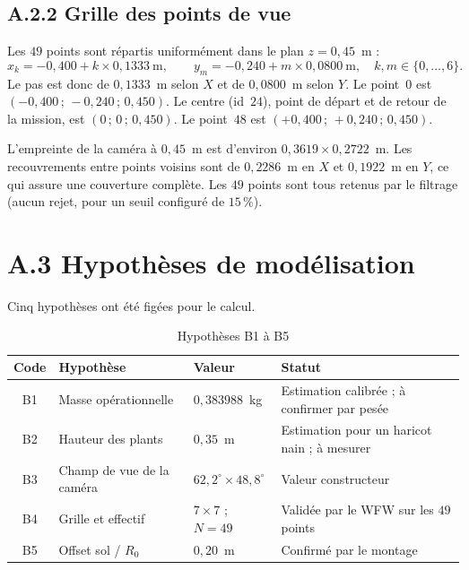 \subsection*{A.2.2 Grille des points de vue}

Les $49$ points sont répartis uniformément dans le plan $z = 0{,}45$~m :
\begin{equation*}
x_k = -0{,}400 + k \times 0{,}1333~\text{m},
\qquad
y_m = -0{,}240 + m \times 0{,}0800~\text{m},
\quad k, m \in \{0, \ldots, 6\}.
\end{equation*}
Le pas est donc de $0{,}1333$~m selon $X$ et de $0{,}0800$~m selon $Y$. Le point~$0$ est $(-0{,}400\,;\, -0{,}240\,;\, 0{,}450)$. Le centre (id~$24$), point de départ et de retour de la mission, est $(0\,;\, 0\,;\, 0{,}450)$. Le point~$48$ est $(+0{,}400\,;\, +0{,}240\,;\, 0{,}450)$.

L'empreinte de la caméra à $0{,}45$~m est d'environ $0{,}3619 \times 0{,}2722$~m. Les recouvrements entre points voisins sont de $0{,}2286$~m en $X$ et $0{,}1922$~m en $Y$, ce qui assure une couverture complète. Les $49$ points sont tous retenus par le filtrage (aucun rejet, pour un seuil configuré de $15\,\%$).

\section*{A.3 Hypothèses de modélisation}

Cinq hypothèses ont été figées pour le calcul.

\begin{table}[H]
\centering
\caption{Hypothèses B1 à B5}
\label{tab:A4}
\footnotesize
\begin{tabular}{|c|p{3.8cm}|p{2.8cm}|p{4.5cm}|}
\hline
\textbf{Code} & \textbf{Hypothèse} & \textbf{Valeur} & \textbf{Statut} \\
\hline
B1 & Masse opérationnelle & $0{,}383988$~kg & Estimation calibrée ; à confirmer par pesée \\
\hline
B2 & Hauteur des plants & $0{,}35$~m & Estimation pour un haricot nain ; à mesurer \\
\hline
B3 & Champ de vue de la caméra & $62{,}2^\circ \times 48{,}8^\circ$ & Valeur constructeur \\
\hline
B4 & Grille et effectif & $7\times7$ ; $N = 49$ & Validée par le WFW sur les $49$ points \\
\hline
B5 & Offset sol / $R_0$ & $0{,}20$~m & Confirmé par le montage \\
\hline
\end{tabular}
\end{table}

